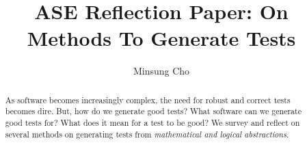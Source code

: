 \documentclass[acmsmall,review]{acmart}\settopmatter{printfolios=true,printccs=false,printacmref=false}
\begin{document}
\title{ASE Reflection Paper: On Methods To Generate Tests} 

\author{Minsung Cho}

\begin{abstract}
    As software becomes increasingly complex, the need for robust and correct tests becomes dire. But, how do we generate good tests? What software can we generate good tests for? What does it mean for a test to be good? We survey and reflect on several methods on generating tests from \textit{mathematical and logical abstractions}.
\end{abstract}

\maketitle


\end{document}
